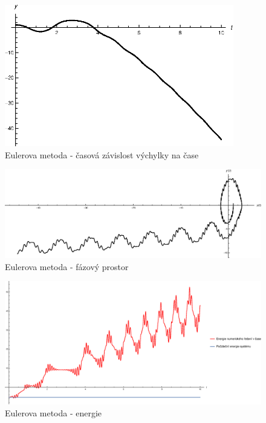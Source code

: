 \begin{description}
\begin{figure}[h]
  \centering
  \includegraphics[width=10cm]{figures/EU1.eps}
  \caption{Eulerova metoda - časová závislost výchylky na čase}
  \label{fig:EU1}
\end{figure}

\begin{figure}[h]
  \centering
  \includegraphics[width=15cm]{figures/EU2.eps}
  \caption{Eulerova metoda - fázový prostor}
  \label{fig:EU2}
\end{figure}

\begin{figure}[h]
  \centering
  \includegraphics[width=15cm]{figures/EU3.eps}
  \caption{Eulerova metoda - energie}
  \label{fig:EU3}
\end{figure}


\end{description}

